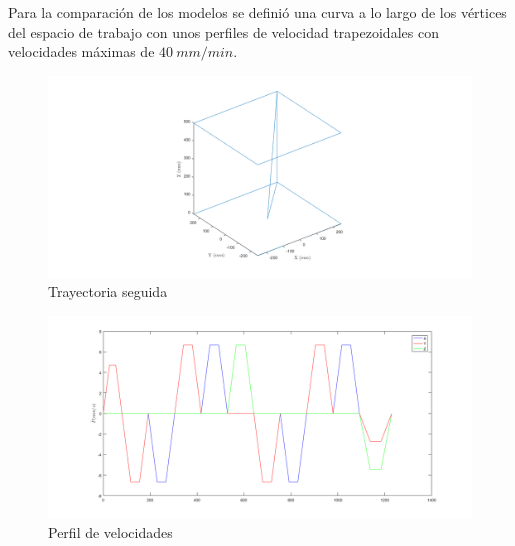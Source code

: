 Para la comparación de los modelos se definió una curva a lo largo de los vértices del espacio de trabajo con unos perfiles de velocidad trapezoidales con velocidades máximas de $40~mm/min$.

\begin{figure}[ht!]
    \centering
    \includegraphics[width = \textwidth]{Cap4_DisenoBasico/Figura/ComparativoSimMechanics/Espacio_De_Trabajo.png}
    \caption{Trayectoria seguida}
    \label{fig:Trayectoria}
\end{figure}

\begin{figure}[hb!]
    \centering
    \includegraphics[width = \textwidth]{Cap4_DisenoBasico/Figura/ComparativoSimMechanics/Perfil_de_velocidades.png}
    \caption{Perfil de velocidades}
    \label{fig:PerfilesdeVelocidad}
\end{figure}

